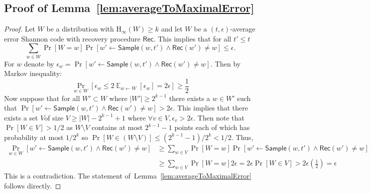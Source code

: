 \documentclass[11pt]{article}
\newcommand{\lemref}[1]{\mbox{Lemma~\ref{#1}}}
\DeclareMathOperator*{\expe}{\mathbb{E}}
\newcommand{\class}[1]{{\ensuremath{\mathsf{#1}}}}
\newcommand{\rec}{\ensuremath{\class{Rec}}\xspace}
\newcommand{\sample}{\ensuremath{\class{Sample}}\xspace}
\newcommand{\Hoo}{\mathrm{H}_\infty}
\begin{document}
\subsection{Proof of \lemref{lem:averageToMaximalError}}
\label{sec:proof of average to maximal error}
\begin{proof}
Let $W$ be a distribution with $\Hoo(W)\geq k$ and let $W$ be a  $(t,\epsilon)$-average error Shannon code with recovery procedure $\rec$.  This implies that for all $t'\le t$
\[
\sum_{w\in W} \Pr[W=w]\Pr[ w'\leftarrow \sample (w, t') \wedge \rec(w') \neq w]\leq \epsilon.
\]
For $w$ denote by $\epsilon_w = \Pr[w'\leftarrow \sample(w, t') \wedge \rec(w') \neq w]$.  Then by Markov inequality:
\[
\Pr_{w\in W}[ \epsilon_w \leq 2\expe_{w\leftarrow W} [\epsilon_w ] = 2\epsilon]\geq \frac{1}{2}
\]
Now suppose that for all $W'\subset W$ where $|W'|\geq 2^{k-1}$ there exists a $w\in W'$ such that $\Pr[ w'\leftarrow \sample (w,t') \wedge \rec(w') \neq w]> 2\epsilon$.  This implies that there exists a set $V$of size $V\geq |W|-2^{k-1}+1$ where $\forall v\in V, \epsilon_v >2\epsilon$.  Then note that $\Pr[W\in V]> 1/2$ as $W\setminus V$ contains at most $2^{k-1}-1$ points each of which has probability at most $1/2^k$ so $\Pr[W\in (W\setminus V)]\leq (2^{k-1}-1)/2^k < 1/2$.  Thus,
\begin{align*}
\Pr_{w\in W}[ w'\leftarrow \sample (w,t') \wedge \rec(w') \neq w]&\geq \sum_{w\in V}  \Pr[W=w]\Pr[ w'\leftarrow \sample (w,t') \wedge \rec(w') \neq w]\\
&\geq \sum_{w\in V} \Pr[W=w] 2\epsilon   = 2\epsilon \Pr[W\in V]> 2\epsilon\left(\frac{1}{2}\right)= \epsilon
\end{align*}
This is a contradiction.  The statement of~\lemref{lem:averageToMaximalError} follows directly.
\end{proof}
\end{document}
